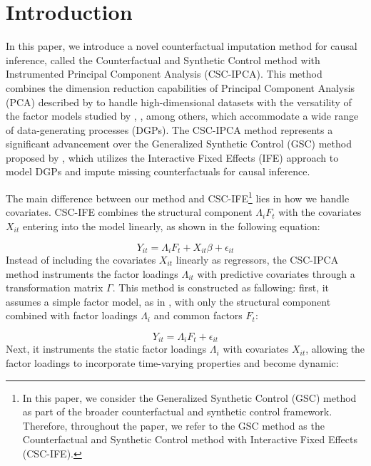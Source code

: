 \documentclass[12pt]{article}
\begin{document}
\pagebreak \newpage
\doublespacing

\section{Introduction} 
\label{sec: introduction}
In this paper, we introduce a novel counterfactual imputation method for causal inference, called the Counterfactual and Synthetic Control method with Instrumented Principal Component Analysis (CSC-IPCA). This method combines the dimension reduction capabilities of Principal Component Analysis (PCA) described by \cite{jollife2016principal} to handle high-dimensional datasets with the versatility of the factor models studied by \cite{bai2003computation}, \cite{bai2009panel}, among others, which accommodate a wide range of data-generating processes (DGPs). The CSC-IPCA method represents a significant advancement over the Generalized Synthetic Control (GSC) method proposed by \cite{xu2017generalized}, which utilizes the Interactive Fixed Effects (IFE) approach to model DGPs and impute missing counterfactuals for causal inference.

The main difference between our method and CSC-IFE\footnote{In this paper, we consider the Generalized Synthetic Control (GSC) method as part of the broader counterfactual and synthetic control framework. Therefore, throughout the paper, we refer to the GSC method as the Counterfactual and Synthetic Control method with Interactive Fixed Effects (CSC-IFE).} lies in how we handle covariates. CSC-IFE combines the structural component $\Lambda_i F_t$ with the covariates $X_{it}$ entering into the model linearly, as shown in the following equation:

\begin{equation}
\label{eqn: ife}
Y_{it} = \Lambda_i F_t + X_{it} \beta + \epsilon_{it}
\end{equation}
Instead of including the covariates $X_{it}$ linearly as regressors, the CSC-IPCA method instruments the factor loadings $\Lambda_{it}$ with predictive covariates through a transformation matrix $\Gamma$. This method is constructed as fallowing: first, it assumes a simple factor model, as in \cite{bai2003computation}, with only the structural component combined with factor loadings $\Lambda_i$ and common factors $F_t$:

\begin{equation}
    \label{eqn: fe}
    Y_{it} = \Lambda_i F_t + \epsilon_{it}
    \end{equation}
    Next, it instruments the static factor loadings $\Lambda_i$ with covariates $X_{it}$, allowing the factor loadings to incorporate time-varying properties and become dynamic:
    
\end{document}
